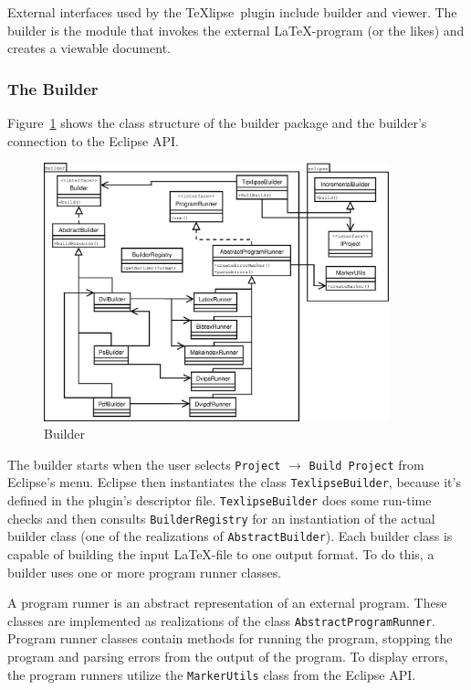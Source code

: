 \documentclass[a4paper,11pt,twoside]{article}
\newcommand{\texlipse}{\TeX lipse}
\begin{document}
External interfaces used by the \texlipse\ plugin include builder and viewer. 
The builder is the module that invokes the external \LaTeX -program (or the 
likes) and creates a viewable document.

\subsubsection{The Builder}

Figure~\ref{fig:builder} shows the class structure of the builder package and 
the builder's connection to the Eclipse API.

\begin{figure}[!htp]
\begin{center}
\includegraphics[width=10cm]{images/builder}
\caption{Builder}
\label{fig:builder}
\end{center}
\end{figure}

The builder starts when the user selects \texttt{Project} $\rightarrow$ 
\texttt{Build Project} from Eclipse's menu. Eclipse then instantiates the class 
\texttt{TexlipseBuilder}, because it's defined in the plugin's descriptor file.
\texttt{TexlipseBuilder} does some run-time checks and then consults \texttt{BuilderRegistry}
for an instantiation of the actual builder class (one of the realizations of 
\texttt{AbstractBuilder}). Each builder class is capable of building the input 
\LaTeX -file to one output format. To do this, a builder uses one or more 
program runner classes.

A program runner is an abstract representation of an external program. These 
classes are implemented as realizations of the class 
\texttt{AbstractProgramRunner}. Program runner classes contain methods for 
running the program, stopping the program and parsing errors from the output of 
the program. To display errors, the program runners utilize the 
\texttt{MarkerUtils} class from the Eclipse API.
\end{document}
